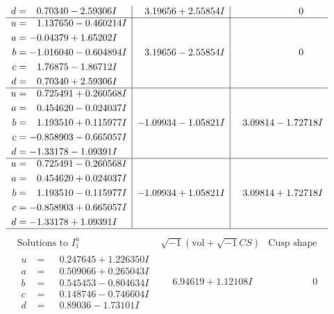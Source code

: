 \documentclass[1p]{elsarticle_modified}
\theoremstyle{definition}
\newcommand{\I}{\sqrt{-1}}
\begin{document}
$$\begin{array}{c|c|c}
\begin{aligned}
d &= \phantom{-}0.70340 - 2.59306 I\end{aligned}
 & \phantom{-}3.19656 + 2.55854 I & \phantom{-0.000000 } 0 \\ \hline\begin{aligned}
u &= \phantom{-}1.137650 - 0.460214 I \\
a &= -0.04379 + 1.65202 I \\
b &= -1.016040 - 0.604894 I \\
c &= \phantom{-}1.76875 - 1.86712 I \\
d &= \phantom{-}0.70340 + 2.59306 I\end{aligned}
 & \phantom{-}3.19656 - 2.55854 I & \phantom{-0.000000 } 0 \\ \hline\begin{aligned}
u &= \phantom{-}0.725491 + 0.260568 I \\
a &= \phantom{-}0.454620 - 0.024037 I \\
b &= \phantom{-}1.193510 + 0.115977 I \\
c &= -0.858903 - 0.665057 I \\
d &= -1.33178 - 1.09391 I\end{aligned}
 & -1.09934 - 1.05821 I & \phantom{-}3.09814 - 1.72718 I \\ \hline\begin{aligned}
u &= \phantom{-}0.725491 - 0.260568 I \\
a &= \phantom{-}0.454620 + 0.024037 I \\
b &= \phantom{-}1.193510 - 0.115977 I \\
c &= -0.858903 + 0.665057 I \\
d &= -1.33178 + 1.09391 I\end{aligned}
 & -1.09934 + 1.05821 I & \phantom{-}3.09814 + 1.72718 I\\
 \hline 
 \end{array}$$\newpage$$\begin{array}{c|c|c}  
\text{Solutions to }I^u_{1}& \I (\text{vol} + \sqrt{-1}CS) & \text{Cusp shape}\\
 \hline 
\begin{aligned}
u &= \phantom{-}0.247645 + 1.226350 I \\
a &= \phantom{-}0.509066 + 0.265043 I \\
b &= \phantom{-}0.545453 - 0.804634 I \\
c &= \phantom{-}0.148746 - 0.746604 I \\
d &= \phantom{-}0.89036 - 1.73101 I\end{aligned}
 & \phantom{-}6.94619 + 1.12108 I & \phantom{-0.000000 } 0 \\ \hline\begin{aligned}

\end{aligned}
\end{array}$$
\end{document}
